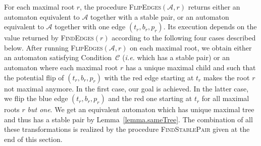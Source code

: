 \documentclass[11pt,a4paper]{article}
\def\A{\mathcal{A}}
\def\C{\mathscr{C}}
\newcommand{\ie}{{\itshape i.e.}\xspace }
\begin{document}
For each maximal root $r$, the procedure \textsc{FlipEdges}$(\A,r)$
returns either an automaton equivalent to $\A$ together with a stable
pair, or an automaton equivalent to $\A$ together with one edge
$(t_r,b_r,p_r)$.  Its execution depends on the value returned by
\textsc{FindEdges}$(r)$ according to the following four cases
described below. After running \textsc{FlipEdges}$(\A,r)$ on each
maximal root, we obtain either an automaton satisfying Condition~$\C$
(\ie which has a stable pair) or an automaton where each maximal root
$r$ has a unique maximal child and such that the potential flip of
$(t_r,b_r,p_r)$ with the red edge starting at $t_r$ makes the root $r$
not maximal anymore. In the first case, our goal is achieved. In the
latter case, we flip the blue edge $(t_r,b_r,p_r)$ and the red one
starting at $t_r$ for all maximal roots $r$ \emph{but one}. We get an
equivalent automaton which has unique maximal tree and thus has a
stable pair by Lemma~\ref{lemma.sameTree}. The combination of all
these transformations is realized by the procedure
\textsc{FindStablePair} given at the end of this section.
\end{document}
